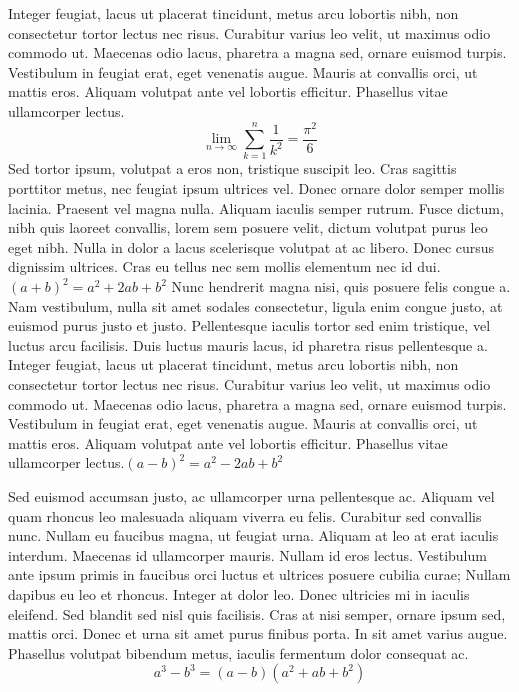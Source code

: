 \documentclass{article}
\begin{document}
 Integer feugiat, lacus ut placerat tincidunt, metus arcu lobortis nibh, non consectetur tortor lectus nec risus. Curabitur varius leo velit, ut maximus odio commodo ut. Maecenas odio lacus, pharetra a magna sed, ornare euismod turpis. Vestibulum in feugiat erat, eget venenatis augue. Mauris at convallis orci, ut mattis eros. Aliquam volutpat ante vel lobortis efficitur. Phasellus vitae ullamcorper lectus.
$$
\lim_{n \to \infty}
\sum_{k=1}^n \frac{1}{k^2}
= \frac{\pi^2}{6}
$$
Sed tortor ipsum, volutpat a eros non, tristique suscipit leo. Cras sagittis porttitor metus, nec feugiat ipsum ultrices vel. Donec ornare dolor semper mollis lacinia. Praesent vel magna nulla. Aliquam iaculis semper rutrum. Fusce dictum, nibh quis laoreet convallis, lorem sem posuere velit, dictum volutpat purus leo eget nibh. Nulla in dolor a lacus scelerisque volutpat at ac libero. Donec cursus dignissim ultrices. Cras eu tellus nec sem mollis elementum nec id dui.
\(
(a+b)^{2}=a^{2}+2ab+b^{2}
\)
Nunc hendrerit magna nisi, quis posuere felis congue a. Nam vestibulum, nulla sit amet sodales consectetur, ligula enim congue justo, at euismod purus justo et justo. Pellentesque iaculis tortor sed enim tristique, vel luctus arcu facilisis. Duis luctus mauris lacus, id pharetra risus pellentesque a. Integer feugiat, lacus ut placerat tincidunt, metus arcu lobortis nibh, non consectetur tortor lectus nec risus. Curabitur varius leo velit, ut maximus odio commodo ut. Maecenas odio lacus, pharetra a magna sed, ornare euismod turpis. Vestibulum in feugiat erat, eget venenatis augue. Mauris at convallis orci, ut mattis eros. Aliquam volutpat ante vel lobortis efficitur. Phasellus vitae ullamcorper lectus.$(a-b)^{2}=a^{2}-2ab+b^{2} $

Sed euismod accumsan justo, ac ullamcorper urna pellentesque ac. Aliquam vel quam rhoncus leo malesuada aliquam viverra eu felis. Curabitur sed convallis nunc. Nullam eu faucibus magna, ut feugiat urna. Aliquam at leo at erat iaculis interdum. Maecenas id ullamcorper mauris. Nullam id eros lectus. Vestibulum ante ipsum primis in faucibus orci luctus et ultrices posuere cubilia curae; Nullam dapibus eu leo et rhoncus. Integer at dolor leo. Donec ultricies mi in iaculis eleifend. Sed blandit sed nisl quis facilisis. Cras at nisi semper, ornare ipsum sed, mattis orci. Donec et urna sit amet purus finibus porta. In sit amet varius augue. Phasellus volutpat bibendum metus, iaculis fermentum dolor consequat ac.
$$ a^{3} - b^{3} = (a-b)(a^{2}+ab+b^{2}) $$
\end{document}
